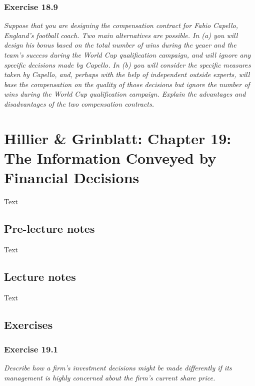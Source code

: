 \documentclass[]{book}
\theoremstyle{definition}
\theoremstyle{definition}
\theoremstyle{remark}
\begin{document}
\subsection{Exercise 18.9}\label{exercise-18.9}

\emph{Suppose that you are designing the compensation contract for Fabio
Capello, England's football coach. Two main alternatives are possible.
In (a) you will design his bonus based on the total number of wins
during the yeaer and the team's success during the World Cup
qualification campaign, and will ignore any specific decisions made by
Capello. In (b) you will consider the specific measures taken by
Capello, and, perhaps with the help of independent outside experts, will
base the compensation on the quality of those decisions but ignore the
number of wins during the World Cup qualification campaign. Explain the
advantages and disadvantages of the two compensation contracts.}
\citep[p.610]{book}

\chapter{Hillier \& Grinblatt: Chapter 19: The Information Conveyed by
Financial
Decisions}\label{hillier-grinblatt-chapter-19-the-information-conveyed-by-financial-decisions}

Text

\section{Pre-lecture notes}\label{pre-lecture-notes-19}

Text

\section{Lecture notes}\label{lecture-notes-19}

Text

\section{Exercises}\label{exercises-19}

\subsection{Exercise 19.1}\label{exercise-19.1}

\emph{Describe how a firm's investment decisions might be made
differently if its management is highly concerned about the firm's
current share price.} \citep[p.641]{book}
\end{document}
